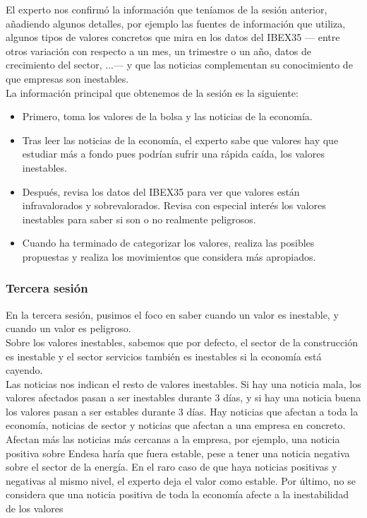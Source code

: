 El experto nos confirmó la información que teníamos de la sesión anterior, añadiendo algunos detalles, por ejemplo las fuentes de información que utiliza, algunos tipos de valores concretos que mira en los datos del IBEX35 --- entre otros variación con respecto a un mes, un trimestre o un año, datos de crecimiento del sector, ...--- y que las noticias complementan su conocimiento de que empresas son inestables.\\

La información principal que obtenemos de la sesión es la siguiente:
\begin{itemize}
\item Primero, toma los valores de la bolsa y las noticias de la economía.
\item Tras leer las noticias de la economía, el experto sabe que valores hay que estudiar más a fondo pues podrían sufrir una rápida caída, los valores inestables.
\item Después, revisa los datos del IBEX35 para ver que valores están infravalorados y sobrevalorados. Revisa con especial interés los valores inestables para saber si son o no realmente peligrosos.
\item Cuando ha terminado de categorizar los valores, realiza las posibles propuestas y realiza los movimientos que considera más apropiados.
\end{itemize}

\subsubsection{Tercera sesión}

En la tercera sesión, pusimos el foco en saber cuando un valor es inestable, y cuando un valor es peligroso.\\

Sobre los valores inestables, sabemos que por defecto, el sector de la construcción es inestable y el sector servicios también es inestables si la economía está cayendo.\\

Las noticias nos indican el resto de valores inestables. Si hay una noticia mala, los valores afectados pasan a ser inestables durante 3 días, y si hay una noticia buena los valores pasan a ser estables durante 3 días. Hay noticias que afectan a toda la economía, noticias de sector y noticias que afectan a una empresa en concreto. Afectan más las noticias más cercanas a la empresa, por ejemplo, una noticia positiva sobre Endesa haría que fuera estable, pese a tener una noticia negativa sobre el sector de la energía. En el raro caso de que haya noticias positivas y negativas al mismo nivel, el experto deja el valor como estable. Por último, no se considera que una noticia positiva de toda la economía afecte a la inestabilidad de los valores\\

